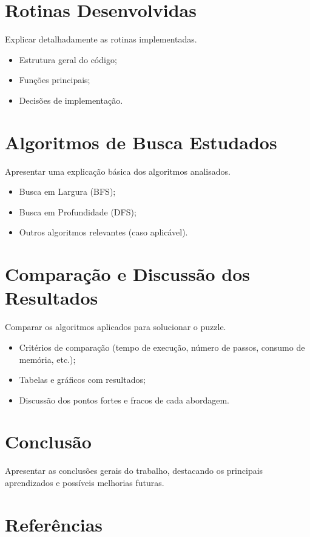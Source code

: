 \documentclass[12pt,a4paper]{article}
\begin{document}
\section{Rotinas Desenvolvidas}
Explicar detalhadamente as rotinas implementadas.
\begin{itemize}
\item Estrutura geral do código;
\item Funções principais;
\item Decisões de implementação.
\end{itemize}

\section{Algoritmos de Busca Estudados}
Apresentar uma explicação básica dos algoritmos analisados.
\begin{itemize}
\item Busca em Largura (BFS);
\item Busca em Profundidade (DFS);
\item Outros algoritmos relevantes (caso aplicável).
\end{itemize}

\section{Comparação e Discussão dos Resultados}
Comparar os algoritmos aplicados para solucionar o puzzle.
\begin{itemize}
\item Critérios de comparação (tempo de execução, número de passos, consumo de memória, etc.);
\item Tabelas e gráficos com resultados;
\item Discussão dos pontos fortes e fracos de cada abordagem.
\end{itemize}

\section{Conclusão}
Apresentar as conclusões gerais do trabalho, destacando os principais aprendizados e possíveis melhorias futuras.

\section*{Referências}


\end{document}
